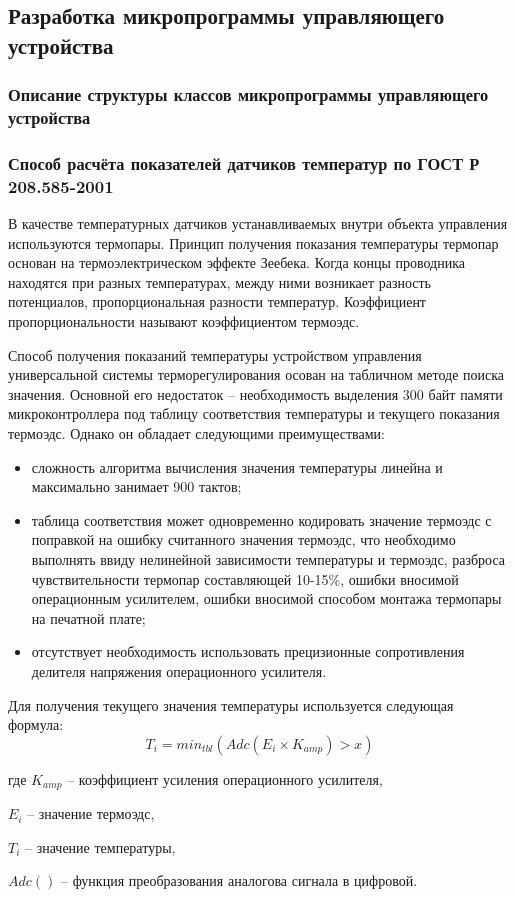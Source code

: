\subsection{Разработка микропрограммы управляющего устройства}



\subsubsection{Описание структуры классов микропрограммы управляющего устройства}


\subsubsection{Способ расчёта показателей датчиков температур по ГОСТ Р 208.585-2001}
В качестве температурных датчиков устанавливаемых внутри объекта управления используются
термопары. Принцип получения показания температуры термопар основан на
термоэлектрическом эффекте Зеебека. Когда концы проводника находятся при разных температурах,
между ними возникает разность потенциалов, пропорциональная разности температур.
Коэффициент пропорциональности называют коэффициентом термоэдс.

Способ получения показаний температуры устройством управления универсальной
системы терморегулирования осован на табличном методе поиска значения.
Основной его недостаток -- необходимость выделения 300 байт памяти микроконтроллера под
таблицу соответствия температуры и текущего показания термоэдс.
Однако он обладает следующими преимуществами:
\begin{itemize}
	\item{} сложность алгоритма вычисления значения температуры линейна и максимально занимает
		900 тактов;
	\item{} таблица соответствия может одновременно кодировать значение термоэдс с поправкой на
		ошибку считанного значения термоэдс, что необходимо выполнять ввиду нелинейной зависимости
		температуры и термоэдс, разброса чувствительности термопар составляющей 10-15\%, ошибки
		вносимой операционным усилителем, ошибки вносимой способом монтажа термопары на печатной плате;
	\item{} отсутствует необходимость использовать прецизионные сопротивления делителя
		напряжения операционного усилителя.
\end{itemize}

Для получения текущего значения температуры используется следующая формула:
\begin{equation}
	T_i = min_{tbl}(Adc(E_i \times{} K_{amp}) > x) 
\end{equation}
\begin{ESKDexplanation}
	\item[где ]{} $K_{amp}$ -- коэффициент усиления операционного усилителя,
	\item{} $E_i$ -- значение термоэдс,
	\item{} $T_i$ -- значение температуры,
	\item{} $Adc()$ -- функция преобразования аналогова сигнала в цифровой.
\end{ESKDexplanation}


